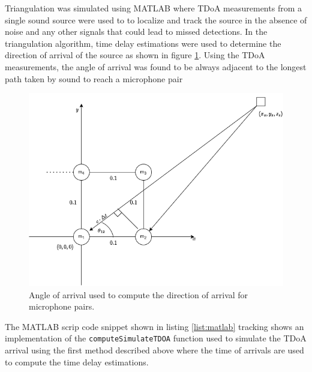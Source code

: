 \documentclass[a4paper,11pt]{article}
\begin{document}
Triangulation was simulated using MATLAB where TDoA measurements from a single sound source were used to to localize and track the source in the absence of noise and any other signals that could lead to missed detections. In the triangulation algorithm, time delay estimations were used to determine the direction of arrival of the source as shown in figure \ref{fig:tdoa-diag}. Using the TDoA measurements, the angle of arrival was found to be always adjacent to the longest path taken by sound to reach a microphone pair

\begin{figure}[ht!]
	\centering
	\includegraphics[width=0.8\linewidth]{triangulation_2.png}
	\caption{Angle of arrival used to compute the direction of arrival for microphone pairs.}
	\label{fig:tdoa-diag}
\end{figure}

The MATLAB scrip code snippet shown in listing \ref{list:matlab} tracking shows an implementation of the \texttt{computeSimulateTDOA} function used to simulate the TDoA arrival using the first method described above where the time of arrivals are used to compute the time delay estimations. 
\end{document}
